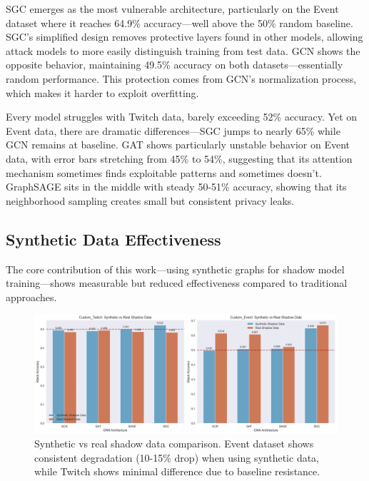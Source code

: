 \documentclass{article}
\begin{document}
SGC emerges as the most vulnerable architecture, particularly on the Event dataset where it reaches 64.9\% accuracy---well above the 50\% random baseline. SGC's simplified design removes protective layers found in other models, allowing attack models to more easily distinguish training from test data. GCN shows the opposite behavior, maintaining 49.5\% accuracy on both datasets---essentially random performance. This protection comes from GCN's normalization process, which makes it harder to exploit overfitting.

Every model struggles with Twitch data, barely exceeding 52\% accuracy. Yet on Event data, there are dramatic differences---SGC jumps to nearly 65\% while GCN remains at baseline. GAT shows particularly unstable behavior on Event data, with error bars stretching from 45\% to 54\%, suggesting that its attention mechanism sometimes finds exploitable patterns and sometimes doesn't. GraphSAGE sits in the middle with steady 50-51\% accuracy, showing that its neighborhood sampling creates small but consistent privacy leaks.

\subsection{Synthetic Data Effectiveness}
The core contribution of this work—using synthetic graphs for shadow model training—shows measurable but reduced effectiveness compared to traditional approaches.

\begin{figure}[H]
\centering
\includegraphics[width=\textwidth]{../Results/visualizations/synthetic_vs_real_comparison.png}
\caption{Synthetic vs real shadow data comparison. Event dataset shows consistent degradation (10-15\% drop) when using synthetic data, while Twitch shows minimal difference due to baseline resistance.}
\label{fig:synthetic-comparison}
\end{figure}
\end{document}

